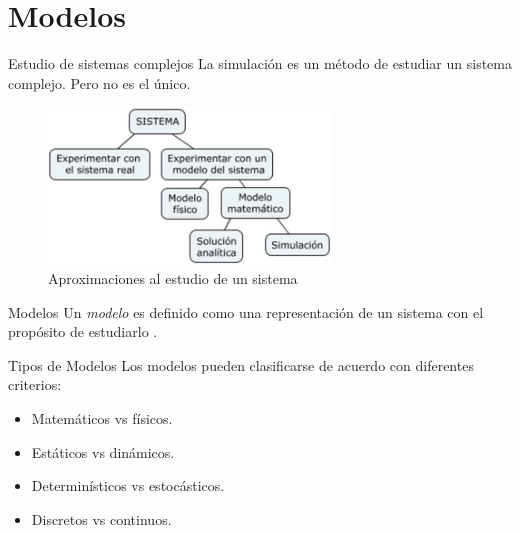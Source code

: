 \section{Modelos}

\begin{frame}{Estudio de sistemas complejos}
    La simulación es un método de estudiar un sistema complejo. Pero no es el único.
    \begin{figure}
        \centering
        \includegraphics[width=7.5cm]{images/Sistema.jpg}
        \caption{Aproximaciones al estudio de un sistema}
        \label{fig:tipos_sol}
    \end{figure}
\end{frame}

\begin{frame}{Modelos}
    Un \textit{modelo} es definido como una representación de un sistema con el propósito de estudiarlo \cite{LK}.
\end{frame}

\begin{frame}{Tipos de Modelos}
    Los modelos pueden clasificarse de acuerdo con diferentes criterios:
    \begin{itemize}
        \item Matemáticos vs físicos.
        \item Estáticos vs dinámicos.
        \item Determinísticos vs estocásticos.
        \item Discretos vs continuos.
    \end{itemize}
\end{frame}